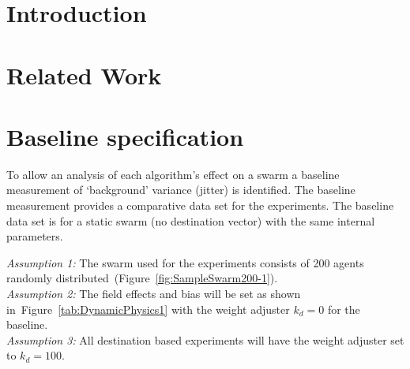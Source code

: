 \documentclass{ieeeaccess}
\begin{document}
\maketitle

\IEEEdisplaynotcompsoctitleabstractindextext


%
\IEEEpeerreviewmaketitle

\section{Introduction}
\section{Related Work}
\section{Baseline specification}
To allow an analysis of each algorithm's effect on a swarm a baseline measurement of `background' variance (jitter) is identified. The baseline measurement provides a comparative data set for the experiments. The baseline data set is for a static swarm (no destination vector) with the same internal parameters.

\textit{Assumption 1:} The swarm used for the experiments consists of 200 agents randomly distributed~(Figure~\ref{fig:SampleSwarm200-1}).\\ 
\textit{Assumption 2:} The field effects and bias will be set as shown in~Figure~\ref{tab:DynamicPhysics1} with the weight adjuster $k_d = 0$ for the baseline.\\
\textit{Assumption 3:} All destination based experiments will have the weight adjuster set to $k_d = 100$.
\end{document}
